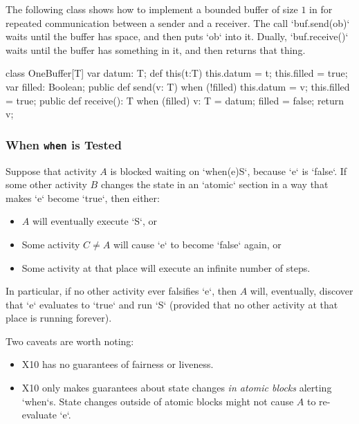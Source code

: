 \begin{ex}
The following class shows how to implement a bounded buffer of size
$1$ in \Xten{} for repeated communication between a sender and a
receiver.  The call \xcd`buf.send(ob)` waits until the buffer has space, and
then puts \xcd`ob` into it.  Dually, \xcd`buf.receive()` waits until the
buffer has something in it, and then returns that thing.


\begin{xten}
class OneBuffer[T] {
  var datum: T;
  def this(t:T) { this.datum = t; this.filled = true; }
  var filled: Boolean;
  public def send(v: T) {
    when (!filled) {
      this.datum = v;
      this.filled = true;
    }
  }
  public def receive(): T {
    when (filled) {
      v: T = datum;
      filled = false;
      return v;
    }
  }
}
\end{xten}
%
\end{ex}

\subsubsection{When  {\tt when} is Tested}

Suppose that activity {$A$} is blocked waiting on \xcd`when(e)S`, because
\xcd`e` is \xcd`false`.    If some other activity {$B$} changes the state 
in an \xcd`atomic` section in a way that makes \xcd`e` become \xcd`true`, then either: 
\begin{itemize}
\item {$A$} will eventually execute \xcd`S`, or
\item Some activity {$C \ne A$} will cause \xcd`e` to become
  \xcd`false` again, or
\item Some activity at that place will execute an infinite number of steps.
\end{itemize}
In particular, if no other activity ever falsifies \xcd`e`, then {$A$} will,
eventually, discover that \xcd`e` evaluates to \xcd`true` and run
\xcd`S` (provided that no other activity at that place is running
forever). 

Two caveats are worth noting: 
\begin{itemize}
\item X10 has no guarantees of fairness or liveness.
\item X10 only makes guarantees about state changes {\em in atomic blocks}
      alerting \xcd`when`s.  State changes outside of atomic blocks might
      not cause {$A$} to re-evaluate \xcd`e`.  
\end{itemize}

